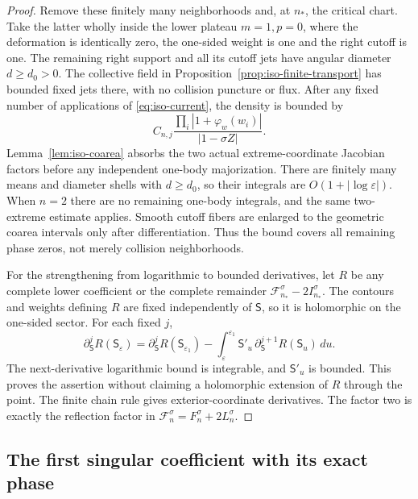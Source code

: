 \documentclass[11pt]{article}
\numberwithin{equation}{section}
\theoremstyle{definition}
\newcommand{\eps}{\varepsilon}
\begin{document}
\begin{proof}
Remove these finitely many neighborhoods and, at $n_*$, the critical
chart.  Take the latter wholly inside the lower plateau $m=1,p=0$,
where the deformation is identically zero, the one-sided weight is
one and the right cutoff is one.  The remaining right support and
all its cutoff jets have angular diameter $d\ge d_0>0$.
The collective field in Proposition~\ref{prop:iso-finite-transport}
has bounded fixed jets there, with no collision puncture or flux.
After any fixed number of applications of \eqref{eq:iso-current},
the density is bounded by
\[
 C_{n,j}\frac{\prod_i|1+\varphi_w(w_i)|}{|1-\sigma Z|}.
\]
Lemma~\ref{lem:iso-coarea} absorbs the two actual extreme-coordinate
Jacobian factors before any independent one-body majorization.
There are finitely many means and diameter shells with $d\ge d_0$,
so their integrals are $O(1+|\log\eps|)$.  When $n=2$ there are
no remaining one-body integrals, and the same two-extreme estimate
applies.  Smooth cutoff fibers are enlarged to the geometric
coarea intervals only after differentiation.  Thus the bound covers
all remaining phase zeros, not merely collision neighborhoods.

For the strengthening from logarithmic to bounded derivatives, let
$R$ be any complete lower coefficient or the complete remainder
$\mathcal F_{n_*}^\sigma-2I_{n_*}^\sigma$.
The contours and weights defining $R$ are fixed independently of
$\mathsf S$, so it is holomorphic on the one-sided sector.  For each
fixed $j$,
\[
 \partial_{\mathsf S}^{j}R(\mathsf S_\eps)
 =\partial_{\mathsf S}^{j}R(\mathsf S_{\eps_1})
  -\int_\eps^{\eps_1}
      \mathsf S'_u\,
      \partial_{\mathsf S}^{j+1}R(\mathsf S_u)\,du.
\]
The next-derivative logarithmic bound is integrable, and
$\mathsf S'_u$ is bounded.  This proves the assertion without
claiming a holomorphic extension of $R$ through the point.
The finite chain rule gives exterior-coordinate derivatives.
The factor two is exactly the reflection factor in
$\mathcal F_n^\sigma=F_n^\sigma+2L_n^\sigma$.
\end{proof}

\subsection{The first singular coefficient with its exact phase}
\end{document}
